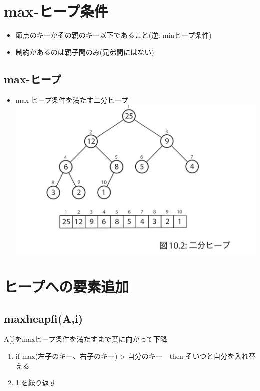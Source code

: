 \documentclass[11pt]{article}
\makeatletter
\def\maxwidth{\ifdim\Gin@nat@width>\linewidth\linewidth
    \else\Gin@nat@width\fi}
\let\Oldincludegraphics\includegraphics
\renewcommand{\includegraphics}[1]{\Oldincludegraphics[width=.8\maxwidth]{#1}}
\providecommand{\tightlist}{%
      \setlength{\itemsep}{0pt}\setlength{\parskip}{0pt}}
\makeatother
\begin{document}
    \section{max-ヒープ条件}\label{max-ux30d2ux30fcux30d7ux6761ux4ef6}

\begin{itemize}
\tightlist
\item
  節点のキーがその親のキー以下であること(逆: minヒープ条件)
\item
  制約があるのは親子間のみ(兄弟間にはない)
\end{itemize}

\subsection{max-ヒープ}\label{max-ux30d2ux30fcux30d7}

\begin{itemize}
\tightlist
\item
  max ヒープ条件を満たす二分ヒープ \includegraphics{./imgs/BH.png}
\end{itemize}

    \section{ヒープへの要素追加}\label{ux30d2ux30fcux30d7ux3078ux306eux8981ux7d20ux8ffdux52a0}

\subsection{maxheapfi(A,i)}\label{maxheapfiai}

A{[}i{]}をmaxヒープ条件を満たすまで葉に向かって下降

\begin{enumerate}
\def\labelenumi{\arabic{enumi}.}
\tightlist
\item
  if max(左子のキー、右子のキー) \textgreater{} 自分のキー　then
  そいつと自分を入れ替える
\item
  1.を繰り返す
\end{enumerate}
\end{document}
